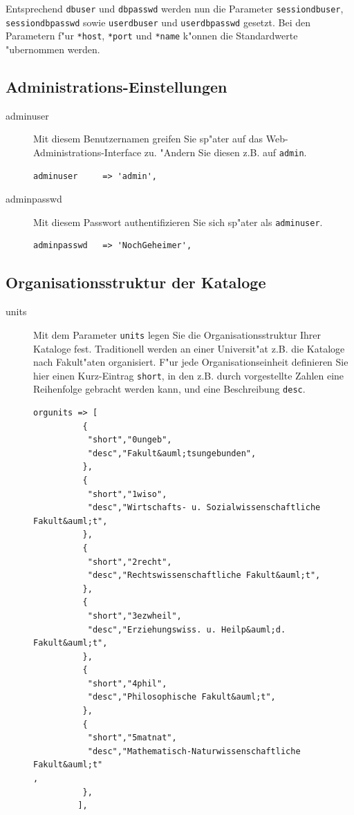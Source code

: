 \documentclass[11pt, twoside, a4paper, BCOR8mm, DIV12, bibtotoc,idxtotoc]{scrbook}
\begin{document}
Entsprechend \texttt{dbuser} und \texttt{dbpasswd} werden nun die
Parameter \texttt{sessiondbuser}, \texttt{sessiondbpasswd} sowie
\texttt{userdbuser} und \texttt{userdbpasswd} gesetzt. Bei den
Parametern f"ur \texttt{*host}, \texttt{*port} und \texttt{*name}
k"onnen die Standardwerte "ubernommen werden.



\subsection{Administrations-Einstellungen}
\label{ssec:admineinstellung}

\begin{description}
\item[adminuser] Mit diesem Benutzernamen greifen Sie sp"ater auf das
  Web-Administrations-Interface zu. "Andern Sie diesen z.B. auf
  \texttt{admin}.
\begin{verbatim}
adminuser     => 'admin',
\end{verbatim}
\item[adminpasswd] Mit diesem Passwort authentifizieren Sie sich
  sp"ater als \texttt{adminuser}.
\begin{verbatim}
adminpasswd   => 'NochGeheimer',
\end{verbatim}
\end{description}


\subsection{Organisationsstruktur der Kataloge}

\begin{description}
\item[units] Mit dem Parameter \texttt{units} legen Sie die
  Organisationsstruktur Ihrer Kataloge fest. Traditionell werden an
  einer Universit"at z.B. die Kataloge nach Fakult"aten
  organisiert. F"ur jede Organisationseinheit definieren Sie hier
  einen Kurz-Eintrag \texttt{short}, in den z.B. durch vorgestellte
  Zahlen eine Reihenfolge gebracht werden kann, und eine Beschreibung
  \texttt{desc}. 
\begin{verbatim}
orgunits => [
          {
           "short","0ungeb",
           "desc","Fakult&auml;tsungebunden",
          },
          {
           "short","1wiso",
           "desc","Wirtschafts- u. Sozialwissenschaftliche Fakult&auml;t",
          },
          {
           "short","2recht",
           "desc","Rechtswissenschaftliche Fakult&auml;t",
          },
          {
           "short","3ezwheil",
           "desc","Erziehungswiss. u. Heilp&auml;d. Fakult&auml;t",
          },
          {
           "short","4phil",
           "desc","Philosophische Fakult&auml;t",
          },
          {
           "short","5matnat",
           "desc","Mathematisch-Naturwissenschaftliche Fakult&auml;t"
,
          },
         ],
\end{verbatim}
\end{description}
\end{document}
